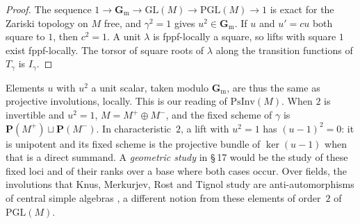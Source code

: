 \documentclass[11pt,a4paper]{amsart}
\newcommand{\GL}{\mathrm{GL}}
\newcommand{\PGL}{\mathrm{PGL}}
\newcommand{\Gm}{\mathbf{G}_{\mathrm m}}
\newcommand{\Pj}{\mathbf{P}}
\theoremstyle{plain}
\theoremstyle{definition}
\begin{document}
\begin{proof}
The sequence $1\to\Gm\to\GL(M)\to\PGL(M)\to1$ is exact for the Zariski topology on $M$ free, and $\gamma^2=1$ gives $u^2\in\Gm$. If $u$ and $u'=cu$ both square to $1$, then $c^2=1$. A unit $\lambda$ is fppf-locally a square, so lifts with square $1$ exist fppf-locally. The torsor of square roots of $\lambda$ along the transition functions of $T_\gamma$ is $I_\gamma$.
\end{proof}

Elements $u$ with $u^2$ a unit scalar, taken modulo $\Gm$, are thus the same as projective involutions, locally. This is our reading of $\mathrm{PsInv}(M)$. When $2$ is invertible and $u^2=1$, $M=M^+\oplus M^-$, and the fixed scheme of $\gamma$ is $\Pj(M^+)\sqcup\Pj(M^-)$. In characteristic~$2$, a lift with $u^2=1$ has $(u-1)^2=0$: it is unipotent and its fixed scheme is the projective bundle of $\ker(u-1)$ when that is a direct summand. A \emph{geometric study} in \S\,17 would be the study of these fixed loci and of their ranks over a base where both cases occur. Over fields, the involutions that Knus, Merkurjev, Rost and Tignol study are anti-automorphisms of central simple algebras \cite{kmrt}, a different notion from these elements of order~$2$ of $\PGL(M)$.
\end{document}
